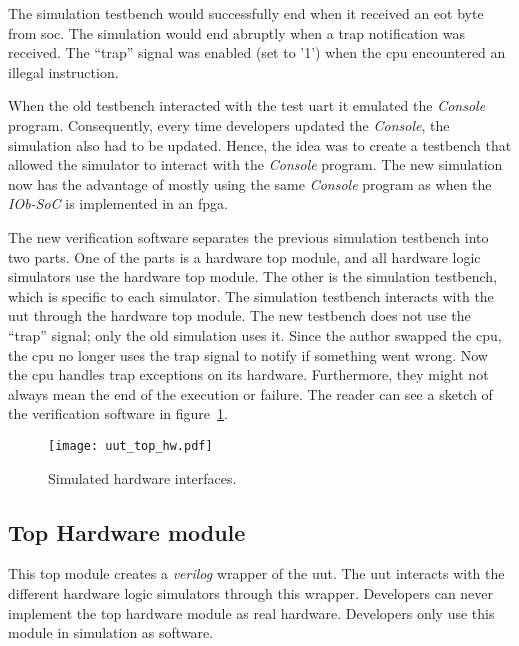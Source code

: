 The simulation testbench would successfully end when it received an \acrshort{eot} byte from \acrshort{soc}. The simulation would end abruptly when a trap notification was received. The \enquote{trap} signal was enabled (set to '1') when the \acrshort{cpu} encountered an illegal instruction.

When the old testbench interacted with the test \acrshort{uart} it emulated the \textit{Console} program. Consequently, every time developers updated the \textit{Console}, the simulation also had to be updated. Hence, the idea was to create a testbench that allowed the simulator to interact with the \textit{Console} program. The new simulation now has the advantage of mostly using the same \textit{Console} program as when the \textit{IOb-SoC} is implemented in an \acrshort{fpga}.

The new verification software separates the previous simulation testbench into two parts. One of the parts is a hardware top module, and all hardware logic simulators use the hardware top module. The other is the simulation testbench, which is specific to each simulator. The simulation testbench interacts with the \acrshort{uut} through the hardware top module. The new testbench does not use the \enquote{trap} signal; only the old simulation uses it. Since the author swapped the \acrshort{cpu}, the \acrshort{cpu} no longer uses the trap signal to notify if something went wrong. Now the \acrshort{cpu} handles trap exceptions on its hardware. Furthermore, they might not always mean the end of the execution or failure. The reader can see a sketch of the verification software in figure~\ref{fig:uut_top_hw}.

\begin{figure}[!ht]
    \centering
    \texttt{[image: uut\_top\_hw.pdf]}
    \caption{Simulated hardware interfaces.}
    \label{fig:uut_top_hw}
\end{figure}

\subsection{Top Hardware module}
This top module creates a \textit{verilog} wrapper of the \acrfull{uut}. The \acrshort{uut} interacts with the different hardware logic simulators through this wrapper. Developers can never implement the top hardware module as real hardware. Developers only use this module in simulation as software.

